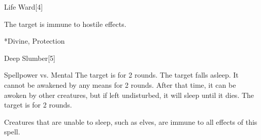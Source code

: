\begin{spellsection}{Life Ward}[4]
    \begin{spellheader}
    \end{spellheader}
    \begin{spellcontent}
        \begin{spelltargetinginfo}
        \end{spelltargetinginfo}
        \begin{spelleffects}
            \spelleffect The target is immune to hostile  effects.
            \spelldur \durshort
        \end{spelleffects}
    \end{spellcontent}
    \begin{spellfooter}
        *{Divine, Protection}
        \miscastexplode
    \end{spellfooter}
\end{spellsection}

\begin{spellsection}{Deep Slumber}[5]
    \begin{spellheader}
    \end{spellheader}
    \begin{spellcontent}
        \begin{spelltargetinginfo}
        \end{spelltargetinginfo}
        \begin{spelleffects}
            \begin{spellattack}{Spellpower vs. Mental}
                \spellsuccess The target is \blinded for 2 rounds.
                \spellcritical The target falls asleep. It cannot be awakened by any means for 2 rounds. After that time, it can be awoken by other creatures, but if left undisturbed, it will sleep until it dies.
                \spellfailure The target is \dazed for 2 rounds.
            \end{spellattack}
        \end{spelleffects}
    \end{spellcontent}
    \begin{spellfooter}
        \spellnotes Creatures that are unable to sleep, such as elves, are immune to all effects of this spell.
        \miscastrandom
    \end{spellfooter}
    \begin{spellaugments}
    \end{spellaugments}
\end{spellsection}

